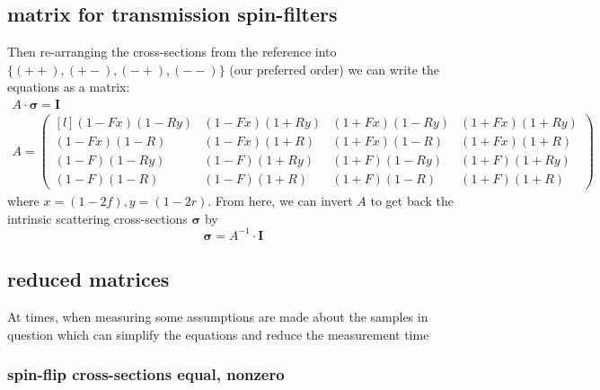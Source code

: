 \documentclass[12pt,letterpaper]{article}
\begin{document}
\subsection{matrix for transmission spin-filters}
Then re-arranging the cross-sections from the reference into 
$\{(++), (+-), (-+), (--)\}$ (our preferred order) 
we can write the equations as a matrix:
\begin{equation}
\begin{array}{c}
	 A \cdot \boldsymbol{\sigma} = \mathbf{I} \\[1em]

  A = 
  \begin{pmatrix*}[l]
	(1-Fx)(1-Ry) &\!\!\! (1-Fx)(1+Ry) &\!\!\! (1+Fx)(1-Ry) &\!\!\! (1+Fx)(1+Ry) \\
	(1-Fx)(1-R) &\!\!\! (1-Fx)(1+R) &\!\!\! (1+Fx)(1-R) &\!\!\! (1+Fx)(1+R) \\
	(1-F)(1-Ry) &\!\!\! (1-F)(1+Ry) &\!\!\! (1+F)(1-Ry) &\!\!\! (1+F)(1+Ry) \\
	(1-F)(1-R) &\!\!\! (1-F)(1+R) &\!\!\! (1+F)(1-R) &\!\!\! (1+F)(1+R) 
  \end{pmatrix*}
\end{array}
\end{equation}
where $x = (1 - 2f), y = (1-2r)$.  From here, we can invert $A$ to get back the intrinsic
scattering cross-sections $\boldsymbol{\sigma}$ by
\begin{equation}
	\boldsymbol{\sigma} = A^{-1} \cdot \mathbf{I}
\end{equation}

\subsection{reduced matrices}
At times, when measuring some assumptions are made about the samples in question which can
simplify the equations and reduce the measurement time
\subsubsection{spin-flip cross-sections equal, nonzero}
\end{document}
